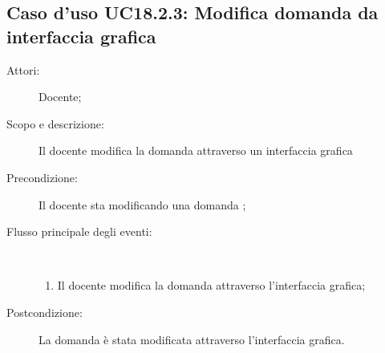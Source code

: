 \subsection{Caso d'uso UC18.2.3: Modifica domanda da interfaccia grafica}\begin{description}
\item[Attori:] Docente;
\item[Scopo e descrizione:] Il docente modifica la domanda attraverso un interfaccia grafica

      \item[Precondizione:] Il docente sta modificando una domanda
;

        \item[Flusso principale degli eventi:] \ 
 \begin{enumerate}
          \item Il docente modifica la domanda attraverso l'interfaccia grafica;

      \end{enumerate}
    \item[Postcondizione:] La domanda è stata modificata attraverso l'interfaccia grafica.
  \end{description}
\hypertarget{UC18.3}{}
